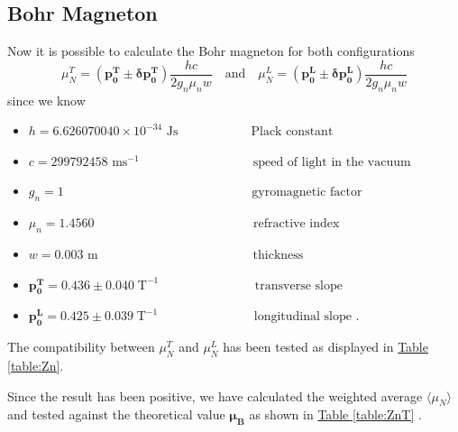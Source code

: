 \documentclass[a4paper,12pt,abstracton]{scrartcl}
\begin{document}
\subsection{Bohr Magneton}
Now it is possible to calculate the Bohr magneton for both configurations $$\mu_N^T= (\boldsymbol{p_0^T}\pm \boldsymbol{\delta p_0^T})\frac{hc}{2g_n\mu_n w} \quad\text{and}\quad \mu_N^L= (\boldsymbol{p_0^L}\pm \boldsymbol{\delta p_0^L})\frac{hc}{2g_n\mu_n w}$$ 
 since we know 
\begin{itemize}
\item $h=6.626070040\times10^{-34} \text{ Js}  \;\,\quad\qquad\qquad\text{ Plack constant}$  
\item $c=299792458 \text{ ms}^{-1}  \quad\qquad\qquad\qquad\qquad\text{speed of light in the vacuum}$
\item $g_n=1   \;\;\qquad\qquad\qquad\qquad\qquad\qquad\qquad\text{ gyromagnetic factor}$
\item $\mu_n= 1.4560    \;\qquad\qquad\qquad\qquad\qquad\qquad\text{ refractive index}$
\item  $w= 0.003 \text{ m} \;\qquad\qquad\qquad\qquad\qquad\qquad\text{thickness}$
\item $\boldsymbol{p_0^{T}}=0.436 \pm 0.040 \;\text{T}^{-1} \;\quad\qquad\qquad\qquad\text{ transverse slope}$
\item $\boldsymbol{p_0^{L}}=0.425 \pm 0.039 \;\text{T}^{-1} \;\quad\qquad\qquad\qquad\text{ longitudinal slope .}$\newline
\end{itemize}
The compatibility between $\mu_N^T$ and $\mu_N^L$ has been tested as displayed in \hyperref[table:Zn]{Table \ref*{table:Zn}}. 
\begin{table}[H]
\caption{}
\centering
{}
\label{table:Zn}
\end{table}

Since the result has been positive, we have calculated the weighted average $ \langle \mu_N\rangle$ and tested against the theoretical value $\boldsymbol{\mu_B}$ as shown in \hyperref[table:ZnT]{Table \ref*{table:ZnT}} .

\begin{table}[H]
\caption{}
\centering
{}
\label{table:ZnT}
\end{table}


\clearpage
\end{document}
